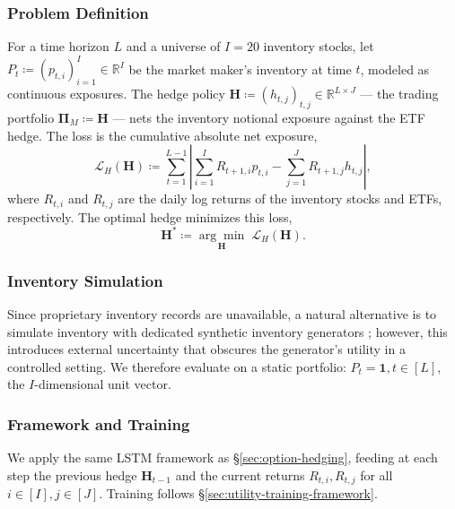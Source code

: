     \subsubsection{Problem Definition}
    For a time horizon \(L\) and a universe of \(I = 20\) inventory
    stocks, let \(P_t \coloneq (p_{t,i})_{i=1}^{I} \in \mathbb{R}^{I}\) be
    the market maker's inventory at time \(t\), modeled as continuous
    exposures. The hedge policy \(\mathbf{H} \coloneq (h_{t,j})_{t,j} \in
    \mathbb{R}^{L \times J}\) --- the trading portfolio \(\mathbf{\Pi}_M
    \coloneq \mathbf{H}\) --- nets the inventory notional exposure against
    the ETF hedge. The loss is the cumulative absolute net exposure,
    \begin{equation}
      \mathcal{L}_{H}(\mathbf{H}) \coloneq \sum_{t=1}^{L-1} \left\vert
      \sum_{i=1}^{I} R_{t+1,i}p_{t,i} - \sum_{j=1}^{J}
      R_{t+1,j}h_{t,j}\right\vert,
      \label{eq:portfolio-hedging-loss}
    \end{equation}
    where \(R_{t,i}\) and \(R_{t,j}\) are the daily log returns of the
    inventory stocks and ETFs, respectively. The optimal hedge minimizes
    this loss,
    \begin{equation}
      \mathbf{H}^{*} \coloneq \underset{\mathbf{H}}{\arg\min}\;
      \mathcal{L}_{H}(\mathbf{H}).
      \label{eq:portfolio-hedging-objective}
    \end{equation}

    \subsubsection{Inventory Simulation}
    Since proprietary inventory records are unavailable, a natural
    alternative is to simulate inventory with dedicated synthetic inventory
    generators \cite{Gueant2011}; however, this introduces external
    uncertainty that obscures the generator's utility in a controlled
    setting. We therefore evaluate on a static portfolio:
    \(P_t = \mathbf{1}, t \in [L]\), the \(I\)-dimensional unit vector.

    \subsubsection{Framework and Training}
    We apply the same LSTM framework as §\ref{sec:option-hedging}, feeding
    at each step the previous hedge \(\mathbf{H}_{t-1}\) and the current
    returns \(R_{t,i}, R_{t,j}\) for all \(i \in [I], j \in [J]\).
    Training follows §\ref{sec:utility-training-framework}.

